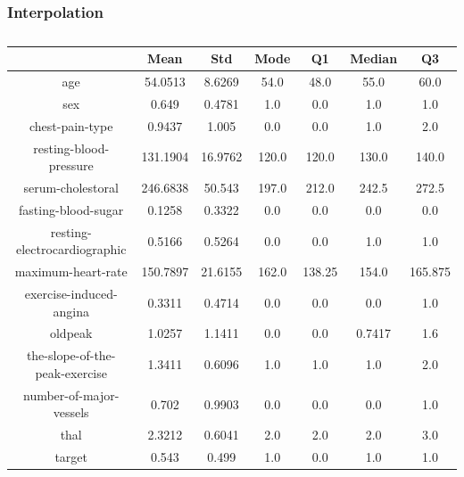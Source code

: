 \documentclass{classrep}
\begin{document}
{{{            }

            \subsubsection{Interpolation}
            \label{results:15-percent:interpolation} {
                \begin{table}[!htbp]
                    \centering
                    \begin{tabular}{|c|c|c|c|c|c|c|}
                        \hline
                        & Mean & Std & Mode & Q1 & Median & Q3 \\ \hline
                        age & 54.0513 & 8.6269 & 54.0 & 48.0 & 55.0 & 60.0 \\ \hline
                        sex & 0.649 & 0.4781 & 1.0 & 0.0 & 1.0 & 1.0 \\ \hline
                        chest-pain-type & 0.9437 & 1.005 & 0.0 & 0.0 & 1.0 & 2.0 \\ \hline
                        resting-blood-pressure & 131.1904 & 16.9762 & 120.0 & 120.0 & 130.0 & 140.0 \\ \hline
                        serum-cholestoral & 246.6838 & 50.543 & 197.0 & 212.0 & 242.5 & 272.5 \\ \hline
                        fasting-blood-sugar & 0.1258 & 0.3322 & 0.0 & 0.0 & 0.0 & 0.0 \\ \hline
                        resting-electrocardiographic & 0.5166 & 0.5264 & 0.0 & 0.0 & 1.0 & 1.0 \\ \hline
                        maximum-heart-rate & 150.7897 & 21.6155 & 162.0 & 138.25 & 154.0 & 165.875 \\ \hline
                        exercise-induced-angina & 0.3311 & 0.4714 & 0.0 & 0.0 & 0.0 & 1.0 \\ \hline
                        oldpeak & 1.0257 & 1.1411 & 0.0 & 0.0 & 0.7417 & 1.6 \\ \hline
                        the-slope-of-the-peak-exercise & 1.3411 & 0.6096 & 1.0 & 1.0 & 1.0 & 2.0 \\ \hline
                        number-of-major-vessels & 0.702 & 0.9903 & 0.0 & 0.0 & 0.0 & 1.0 \\ \hline
                        thal & 2.3212 & 0.6041 & 2.0 & 2.0 & 2.0 & 3.0 \\ \hline
                        target & 0.543 & 0.499 & 1.0 & 0.0 & 1.0 & 1.0 \\ \hline
                    \end{tabular}
                    \caption{}
                    \label{result_15_Interpolation}
                \end{table}
                \FloatBarrier

}}}
\end{document}

